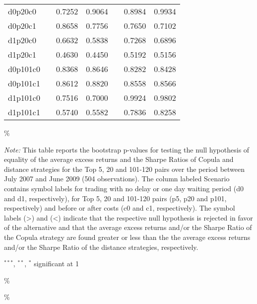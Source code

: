 \documentclass[a4paper]{article}
\begin{document}
\begin{threeparttable}[H]
\begin{tabularx}{\textwidth}{@{\extracolsep{\fill}}lllllll@{}}
			d0p20c0 & & 0.7252 & 0.9064 &       & 0.8984 & 0.9934 \\
			d0p20c1 & & 0.8658 & 0.7756 &       & 0.7650 & 0.7102 \\
			d1p20c0 & & 0.6632 & 0.5838 &       & 0.7268 & 0.6896 \\
			d1p20c1 & & 0.4630 & 0.4450 &       & 0.5192 & 0.5156 \\
			d0p101c0 & & 0.8368 & 0.8646 &       & 0.8282 & 0.8428 \\
			d0p101c1 & & 0.8612 & 0.8820 &       & 0.8558 & 0.8566 \\
			d1p101c0 & & 0.7516 & 0.7000 &       & 0.9924 & 0.9802 \\
			d1p101c1 & & 0.5740 & 0.5582 &       & 0.7836 & 0.8258 \\
			\bottomrule
		\end{tabularx}\%
		\begin{tablenotes}
			\item \textit{Note:} \scriptsize This table reports the bootstrap p-values for testing the null hypothesis of equality of the average excess returns and the Sharpe Ratios of Copula and distance strategies for the Top 5, 20 and 101-120 pairs over the period between July 2007 and June 2009 (504 observations). The column labeled Scenario contains symbol labels for trading with no delay or one day waiting period (d0 and d1, respectively), for Top 5, 20 and 101-120 pairs (p5, p20 and p101, respectively) and before or after costs (c0 and c1, respectively). The symbol labels (>) and (<) indicate that the respective null hypothesis is rejected in favor of the alternative and that the average excess returns and/or the Sharpe Ratio of the Copula strategy are found greater or less than the the average excess returns and/or the Sharpe Ratio of the distance strategies, respectively.
			\item \scriptsize $^{\ast\ast\ast}$, $^{\ast\ast}$, $^{\ast}$  significant at 1\\%
		\end{tablenotes}
		\label{tab:table124}\%
	\end{threeparttable}\%
	
	\medskip
	
\end{document}
